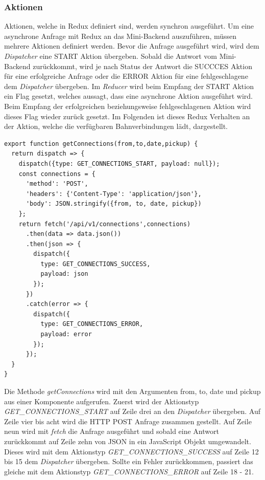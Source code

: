 \subsubsection{Aktionen}
Aktionen, welche in Redux definiert sind, werden synchron ausgeführt. Um eine asynchrone Anfrage mit Redux an das Mini-Backend auszuführen, müssen mehrere Aktionen definiert werden. Bevor die Anfrage ausgeführt wird, wird dem \textit{Dispatcher} eine START Aktion übergeben. Sobald die Antwort vom Mini-Backend zurückkommt, wird je nach Status der Antwort die SUCCCES Aktion für eine erfolgreiche Anfrage oder die ERROR Aktion für eine fehlgeschlagene dem \textit{Dispatcher} übergeben. Im \textit{Reducer} wird beim Empfang der START Aktion ein Flag gesetzt, welches aussagt, dass eine asynchrone Aktion ausgeführt wird. Beim Empfang der erfolgreichen beziehungsweise fehlgeschlagenen Aktion wird dieses Flag wieder zurück gesetzt. Im Folgenden ist dieses Redux Verhalten an der Aktion, welche die verfügbaren Bahnverbindungen lädt, dargestellt.

\begin{lstlisting}[caption=Aktion getConnections]
export function getConnections(from,to,date,pickup) {
  return dispatch => {
    dispatch({type: GET_CONNECTIONS_START, payload: null});
    const connections = {
      'method': 'POST',
      'headers': {'Content-Type': 'application/json'},
      'body': JSON.stringify({from, to, date, pickup})
    };
    return fetch('/api/v1/connections',connections)
      .then(data => data.json())
      .then(json => {
        dispatch({
          type: GET_CONNECTIONS_SUCCESS,
          payload: json
        });
      })
      .catch(error => {
        dispatch({
          type: GET_CONNECTIONS_ERROR,
          payload: error
        });
      });
  }
}
\end{lstlisting}

Die Methode \textit{getConnections} wird mit den Argumenten from, to, date und pickup aus einer Komponente aufgerufen. Zuerst wird der Aktionstyp \textit{GET\_CONNECTIONS\_START} auf Zeile drei an den \textit{Dispatcher} übergeben. Auf Zeile vier bis acht wird die HTTP POST Anfrage zusammen gestellt. Auf Zeile neun wird mit \textit{fetch} die Anfrage ausgeführt und sobald eine Antwort zurückkommt auf Zeile zehn von JSON in ein JavaScript Objekt umgewandelt. Dieses wird mit dem Aktionstyp \textit{GET\_CONNECTIONS\_SUCCESS} auf Zeile 12 bis 15 dem \textit{Dispatcher} übergeben. Sollte ein Fehler zurückkommen, passiert das gleiche mit dem Aktionstyp \textit{GET\_CONNECTIONS\_ERROR} auf Zeile 18 - 21.

